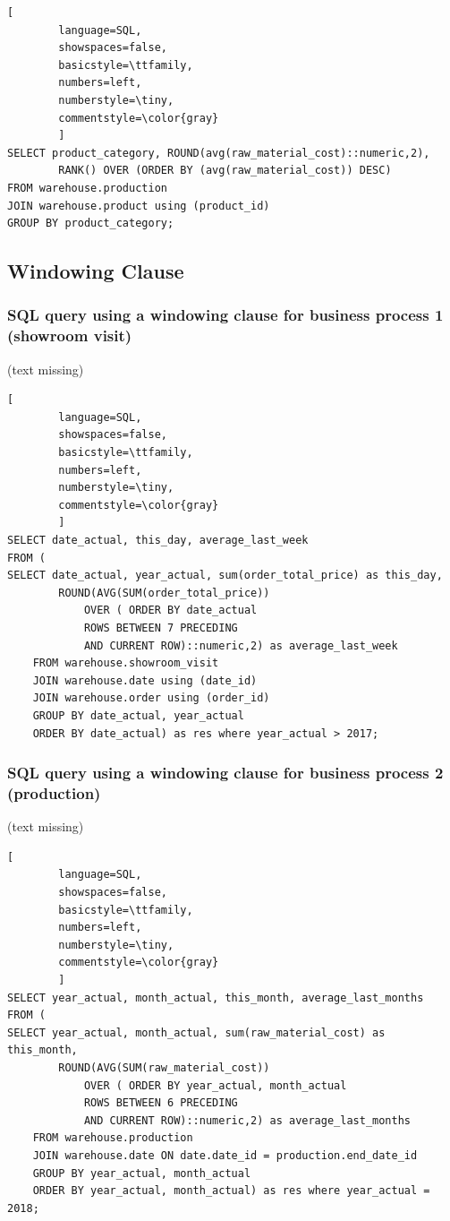 \documentclass[letterpaper,12pt]{article}
\begin{document}
\begin{lstlisting}[
        language=SQL,
        showspaces=false,
        basicstyle=\ttfamily,
        numbers=left,
        numberstyle=\tiny,
        commentstyle=\color{gray}
        ]
SELECT product_category, ROUND(avg(raw_material_cost)::numeric,2),
        RANK() OVER (ORDER BY (avg(raw_material_cost)) DESC)
FROM warehouse.production
JOIN warehouse.product using (product_id)
GROUP BY product_category;
\end{lstlisting}
                
\subsection{Windowing Clause}

\subsubsection{SQL query using a windowing clause for business process 1 (showroom visit)}

(text missing)

\begin{lstlisting}[
        language=SQL,
        showspaces=false,
        basicstyle=\ttfamily,
        numbers=left,
        numberstyle=\tiny,
        commentstyle=\color{gray}
        ]																			   
SELECT date_actual, this_day, average_last_week	
FROM (																		   
SELECT date_actual, year_actual, sum(order_total_price) as this_day, 
		ROUND(AVG(SUM(order_total_price))
			OVER ( ORDER BY date_actual
			ROWS BETWEEN 7 PRECEDING
			AND CURRENT ROW)::numeric,2) as average_last_week
	FROM warehouse.showroom_visit
	JOIN warehouse.date using (date_id)
	JOIN warehouse.order using (order_id)
	GROUP BY date_actual, year_actual
	ORDER BY date_actual) as res where year_actual > 2017;
\end{lstlisting}				  
                
\subsubsection{SQL query using a windowing clause for business process 2 (production)}
(text missing)

\begin{lstlisting}[
        language=SQL,
        showspaces=false,
        basicstyle=\ttfamily,
        numbers=left,
        numberstyle=\tiny,
        commentstyle=\color{gray}
        ]			  
SELECT year_actual, month_actual, this_month, average_last_months
FROM (
SELECT year_actual, month_actual, sum(raw_material_cost) as this_month, 
		ROUND(AVG(SUM(raw_material_cost))
			OVER ( ORDER BY year_actual, month_actual
			ROWS BETWEEN 6 PRECEDING
			AND CURRENT ROW)::numeric,2) as average_last_months
	FROM warehouse.production
	JOIN warehouse.date ON date.date_id = production.end_date_id
	GROUP BY year_actual, month_actual
	ORDER BY year_actual, month_actual) as res where year_actual = 2018;
\end{lstlisting}				  
        
\end{document}
